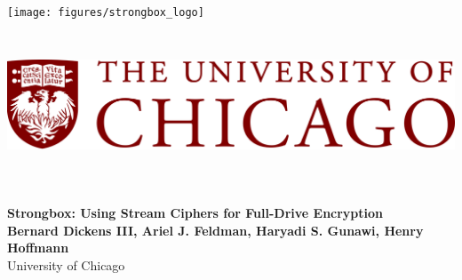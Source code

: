 \documentclass[a0,portrait]{a0poster}
\begin{document}


\begin{minipage}[b]{\linewidth}

\texttt{[image: figures/strongbox\_logo]}\hspace*{0.25cm}
\includegraphics[height=5cm]{figures/uchicago_logo}
\vspace{0.1cm}
\begin{center}
\noindent\makebox[\linewidth]{\rule{0.9\paperwidth}{0.4pt}}
\vspace{0.1cm}
\end{center}

\veryHuge \color{NavyBlue} \textbf{Strongbox: Using Stream Ciphers for Full-Drive Encryption} \color{Black}\\[0.5cm] %
\huge \textbf{Bernard Dickens III, Ariel J. Feldman, Haryadi S. Gunawi, Henry Hoffmann}\\[0.25cm] %
\Large University of Chicago %
\end{minipage}

\vspace{1cm} %

\end{document}
